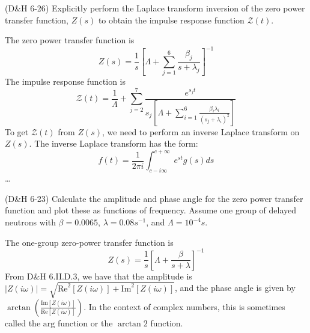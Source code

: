\documentclass[11pt,addpoints,answers]{exam}
\begin{document}
\begin{questions}
\begin{parts}
\begin{solution}
                \end{solution}
        \end{parts}
        \question[20] (D\&H 6-26) Explicitly perform the Laplace transform 
        inversion of the zero power transfer function, $Z(s)$ to obtain the 
        impulse response function $\mathscr{Z}(t)$.
                \begin{solution}
                    The zero power transfer function is
                    \[
                        Z(s) = \frac{1}{s}\left[\Lambda +
                            \sum_{j=1}^{6}\frac{\beta_{j}}{s +
                        \lambda_{j}}\right]^{-1}
                    \]
                    The impulse response function is
                    \[
                        \mathscr{Z}(t) = \frac{1}{\Lambda} +
                        \sum_{j=2}^{7}\frac{e^{s_{j}t}}{s_{j}\left[\Lambda +
                        \sum_{i=1}^{6} \frac{\beta_{i} \lambda_{i}}{(s_{j} +
                        \lambda_{i})^{2}} \right]}
                    \]
                    To get $\mathscr{Z}(t)$ from $Z(s)$, we need to perform an
                    inverse Laplace transform on $Z(s)$. The inverse Laplace
                    transform has the form:
                    \[
                        f(t) = \frac{1}{2\pi i} \int_{c-i\infty}^{c+\infty} e^{st} g(s)
                        ds
                    \]
                    \ldots
                \end{solution}
       
        \question[30] (D\&H 6-23) Calculate the amplitude and phase angle for the 
        zero power transfer function and plot these as functions of frequency. 
        Assume one group of delayed neutrons with $\beta = 0.0065$, $\lambda = 
        0.08s^{-1}$, and $\Lambda = 10^{-4}s$.
                \begin{solution}
                    The one-group zero-power transfer function is
                    \[
                        Z(s) = \frac{1}{s}\left[\Lambda + \frac{\beta}{s +
                        \lambda}\right]^{-1}
                    \]
                    From D\&H 6.II.D.3, we have that the amplitude is
                    $|Z(i\omega)| = \sqrt{\text{Re}^{2}[Z(i\omega)] +
                    \text{Im}^{2}[Z(i\omega)]}$, and the phase angle is given by
                    $\arctan(\frac{\text{Im}[Z(i\omega)]}{\text{Re}[Z(i\omega)]
                    })$. In the context of complex numbers, this is sometimes
                    called the $\text{arg}$ function or the $\arctan 2$
                    function.


\end{solution}
\end{questions}
\end{document}
